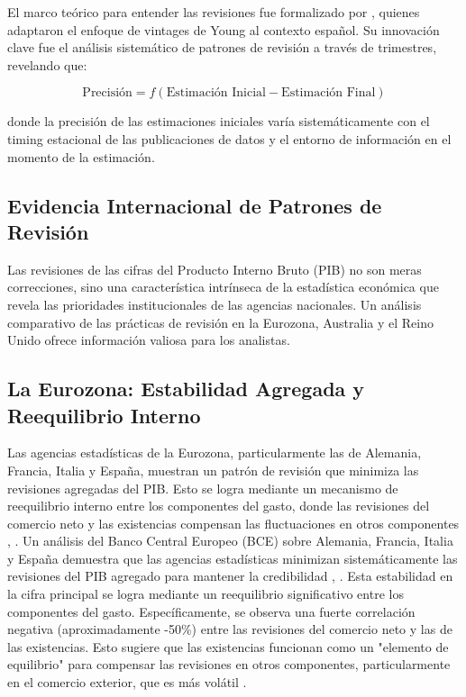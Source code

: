 \documentclass{article}
\begin{document}
El marco teórico para entender las revisiones fue formalizado por \citet{pavia2017}, quienes adaptaron el enfoque de vintages de Young al contexto español. Su innovación clave fue el análisis sistemático de patrones de revisión a través de trimestres, revelando que:

\begin{equation}
\text{Precisión} = f(\text{Estimación Inicial} - \text{Estimación Final})
\end{equation}

donde la precisión de las estimaciones iniciales varía sistemáticamente con el timing estacional de las publicaciones de datos y el entorno de información en el momento de la estimación.

\subsection{Evidencia Internacional de Patrones de Revisión}

Las revisiones de las cifras del Producto Interno Bruto (PIB) no son meras correcciones, sino una característica intrínseca de la estadística económica que revela las prioridades institucionales de las agencias nacionales. Un análisis comparativo de las prácticas de revisión en la Eurozona, Australia y el Reino Unido ofrece información valiosa para los analistas.

\subsection*{La Eurozona: Estabilidad Agregada y Reequilibrio Interno}
Las agencias estadísticas de la Eurozona, particularmente las de Alemania, Francia, Italia y España, muestran un patrón de revisión que minimiza las revisiones agregadas del PIB. Esto se logra mediante un mecanismo de reequilibrio interno entre los componentes del gasto, donde las revisiones del comercio neto y las existencias compensan las fluctuaciones en otros componentes \cite{bce_wp_2857}, \cite{suerf_pb_807}.
Un análisis del Banco Central Europeo (BCE) sobre Alemania, Francia, Italia y España demuestra que las agencias estadísticas minimizan sistemáticamente las revisiones del PIB agregado para mantener la credibilidad \cite{bce_wp_2857}, \cite{suerf_pb_807}. Esta estabilidad en la cifra principal se logra mediante un reequilibrio significativo entre los componentes del gasto. Específicamente, se observa una fuerte correlación negativa (aproximadamente -50\%) entre las revisiones del comercio neto y las de las existencias. Esto sugiere que las existencias funcionan como un "elemento de equilibrio" para compensar las revisiones en otros componentes, particularmente en el comercio exterior, que es más volátil \cite{bce_wp_2857}.
\end{document}
